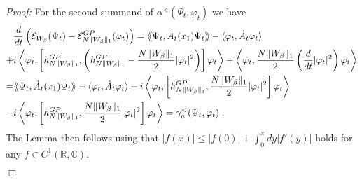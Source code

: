 \documentclass[11pt, english, american]{article}
\newcommand{\laa}{\langle\hspace{-0.08cm}\langle}
\newcommand{\raa}{\rangle\hspace{-0.08cm}\rangle}
\newenvironment{proof}{\emph{Proof:}}{\begin{flushright} $ \Box $ \end{flushright}}
\renewcommand{\phi}{\varphi}
\begin{document}
\begin{proof}
For the second summand of $\alpha^<(\Psi_t,\phi_t)$ we have
\begin{align*}&
\nonumber\frac{d}{dt}\left(\mathcal{E}_{W_\beta}(\Psi_t)-\mathcal{E}_{N \|W_\beta\|_1}^{GP}(\phi_t)\right)
%
=\laa\Psi_t,\dot A_t(x_1)\Psi_t\raa-\langle\phi_t,\dot A_t\phi_t\rangle
%
\\\nonumber+& i
\left\langle\phi_t,\left[h_{N \|W_\beta\|_1}^{GP},\left(h_{N \|W_\beta\|_1}^{GP}-\frac{N \|W_\beta\|_1}{2}|\phi_t|^2\right)\right]\phi_t\right\rangle
+
\left\langle\phi_t,\frac{N \|W_\beta\|_1}{2}\left(\frac{d}{dt}|\phi_t|^2\right)\phi_t\right\rangle
%
\\\nonumber=&\laa\Psi_t,\dot A_t(x_1)\Psi_t\raa-\langle\phi_t,\dot A_t\phi_t\rangle
+i
\left\langle\phi_t,\left[h_{N \|W_\beta\|_1}^{GP},\frac{N \|W_\beta\|_1}{2}|\phi_t|^2\right]\phi_t\right\rangle
\\
-&
i
\left\langle\phi_t,\left[h_{N \|W_\beta\|_1}^{GP},\frac{N \|W_\beta\|_1}{2}|\phi_t|^2\right]\phi_t\right\rangle
=
\gamma_a^<(\Psi_t,\phi_t)
\;.
%
\end{align*}
The Lemma then follows using that 
$
|f(x)| \leq |f(0)|+ \int_0^x dy |f'(y)|
$ holds for any $f \in C^1 (\mathbb{R}, \mathbb{C})$.
\end{proof}
\end{document}
